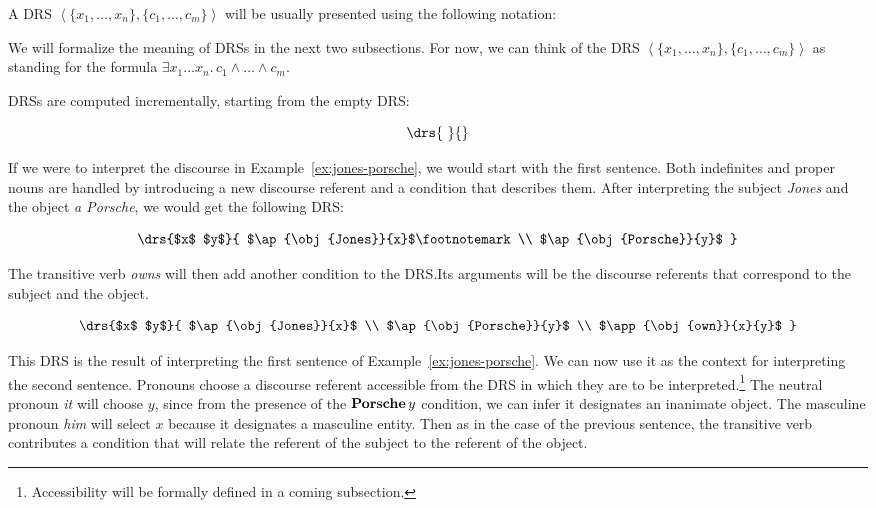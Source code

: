 \begin{notation}
  A DRS $\left< \{ x_1, \ldots, x_n \}, \{ c_1, \ldots, c_m \} \right>$
  will be usually presented using the following notation:

\end{notation}

We will formalize the meaning of DRSs in the next two subsections. For now,
we can think of the DRS
$\left< \{ x_1, \ldots, x_n \}, \{ c_1, \ldots, c_m \} \right>$ as
standing for the formula
$\exists x_1 \ldots x_n.\, c_1 \land \ldots \land c_m$.

DRSs are computed incrementally, starting from the empty DRS:

$$
\drs{\ }{}
$$

If we were to interpret the discourse in Example~\ref{ex:jones-porsche}, we
would start with the first sentence. Both indefinites and proper nouns are
handled by introducing a new discourse referent and a condition that
describes them. After interpreting the subject \emph{Jones} and the object
\emph{a Porsche}, we would get the following DRS:

$$
\drs{$x$ $y$}{
  $\ap{\obj{Jones}}{x}$\footnotemark \\
  $\ap{\obj{Porsche}}{y}$
}
$$


The transitive verb \emph{owns} will then add another condition to the
DRS.\@ Its arguments will be the discourse referents that correspond to the
subject and the object.

$$
\drs{$x$ $y$}{
  $\ap{\obj{Jones}}{x}$ \\
  $\ap{\obj{Porsche}}{y}$ \\
  $\app{\obj{own}}{x}{y}$
}
$$

This DRS is the result of interpreting the first sentence of
Example~\ref{ex:jones-porsche}. We can now use it as the context for
interpreting the second sentence. Pronouns choose a discourse referent
accessible from the DRS in which they are to be
interpreted.\footnote{Accessibility will be formally defined in a coming
  subsection.} The neutral pronoun \emph{it} will choose $y$, since from
the presence of the $\textbf{Porsche}\,y$ condition, we can infer it
designates an inanimate object. The masculine pronoun \emph{him} will
select $x$ because it designates a masculine entity. Then as in the case
of the previous sentence, the transitive verb contributes a condition that
will relate the referent of the subject to the referent of the object.

